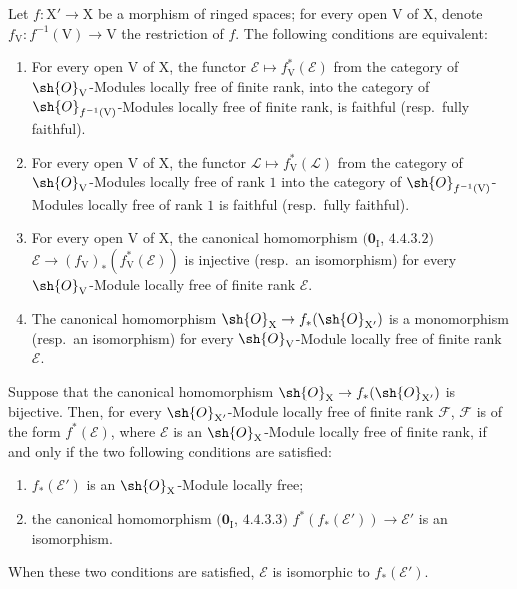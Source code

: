 \begin{lemma}[21.13.2]
\label{IV.21.13.2}
Let $f:\mathrm{X}'\to\mathrm{X}$ be a morphism of ringed spaces; for every open $\mathrm{V}$ of $\mathrm{X}$, denote $f_{\mathrm{V}}:f^{-1}(\mathrm{V})\to\mathrm{V}$ the restriction of $f$.
The following conditions are equivalent:
\begin{enumerate}[label=\emph{\alph*)}]
  \item For every open $\mathrm{V}$ of $\mathrm{X}$, the functor $\mathscr{E}\mapsto f_{\mathrm{V}}^*(\mathscr{E})$ from the category of $\sh{O}_{\mathrm{V}}$-Modules locally free of finite rank, into the category of $\sh{O}_{f^{-1}(\mathrm{V})}$-Modules locally free of finite rank, is faithful (resp.\ fully faithful).
  \item[\emph{a')}] For every open $\mathrm{V}$ of $\mathrm{X}$, the functor $\mathscr{L}\mapsto f_{\mathrm{V}}^*(\mathscr{L})$ from the category of $\sh{O}_{\mathrm{V}}$-Modules locally free of rank $1$ into the category of $\sh{O}_{f^{-1}(\mathrm{V})}$-Modules locally free of rank $1$ is faithful (resp.\ fully faithful).
  \item For every open $\mathrm{V}$ of $\mathrm{X}$, the canonical homomorphism $(\mathbf{0}_{\mathrm{I}}$, $4.4.3.2)$ $\mathscr{E}\to(f_{\mathrm{V}})_*(f_{\mathrm{V}}^*(\mathscr{E}))$ is injective (resp.\ an isomorphism) for every $\sh{O}_{\mathrm{V}}$-Module locally free of finite rank $\mathscr{E}$.
  \item[\emph{b')}] The canonical homomorphism $\sh{O}_{\mathrm{X}}\to f_*(\sh{O}_{\mathrm{X}'})$ is a monomorphism (resp.\ an isomorphism) for every $\sh{O}_{\mathrm{V}}$-Module locally free of finite rank $\mathscr{E}$.
\end{enumerate}

Suppose that the canonical homomorphism $\sh{O}_{\mathrm{X}}\to f_*(\sh{O}_{\mathrm{X}'})$ is bijective.
Then, for every $\sh{O}_{\mathrm{X}'}$-Module locally free of finite rank $\mathscr{F}$, $\mathscr{F}$ is of the form $f^*(\mathscr{E})$, where $\mathscr{E}$ is an $\sh{O}_{\mathrm{X}}$-Module locally free of finite rank, if and only if the two following conditions are satisfied:
\begin{enumerate}[label=(\roman*)]
  \item $f_*(\mathscr{E}')$ is an $\sh{O}_{\mathrm{X}}$-Module locally free;
  \item the canonical homomorphism $(\mathbf{0}_{\mathrm{I}}$, $4.4.3.3)$ $f^*(f_*(\mathscr{E}'))\to\mathscr{E}'$ is an isomorphism.
\end{enumerate}
When these two conditions are satisfied, $\mathscr{E}$ is isomorphic to $f_*(\mathscr{E}')$.
\end{lemma}

